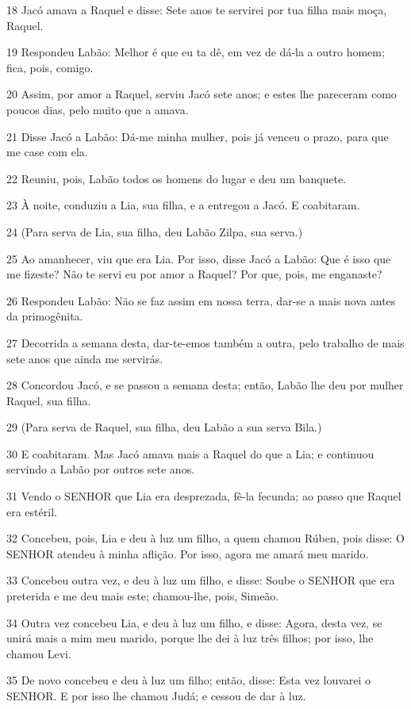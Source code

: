 \par 18 Jacó amava a Raquel e disse: Sete anos te servirei por tua filha mais moça, Raquel.
\par 19 Respondeu Labão: Melhor é que eu ta dê, em vez de dá-la a outro homem; fica, pois, comigo.
\par 20 Assim, por amor a Raquel, serviu Jacó sete anos; e estes lhe pareceram como poucos dias, pelo muito que a amava.
\par 21 Disse Jacó a Labão: Dá-me minha mulher, pois já venceu o prazo, para que me case com ela.
\par 22 Reuniu, pois, Labão todos os homens do lugar e deu um banquete.
\par 23 À noite, conduziu a Lia, sua filha, e a entregou a Jacó. E coabitaram.
\par 24 (Para serva de Lia, sua filha, deu Labão Zilpa, sua serva.)
\par 25 Ao amanhecer, viu que era Lia. Por isso, disse Jacó a Labão: Que é isso que me fizeste? Não te servi eu por amor a Raquel? Por que, pois, me enganaste?
\par 26 Respondeu Labão: Não se faz assim em nossa terra, dar-se a mais nova antes da primogênita.
\par 27 Decorrida a semana desta, dar-te-emos também a outra, pelo trabalho de mais sete anos que ainda me servirás.
\par 28 Concordou Jacó, e se passou a semana desta; então, Labão lhe deu por mulher Raquel, sua filha.
\par 29 (Para serva de Raquel, sua filha, deu Labão a sua serva Bila.)
\par 30 E coabitaram. Mas Jacó amava mais a Raquel do que a Lia; e continuou servindo a Labão por outros sete anos.
\par 31 Vendo o SENHOR que Lia era desprezada, fê-la fecunda; ao passo que Raquel era estéril.
\par 32 Concebeu, pois, Lia e deu à luz um filho, a quem chamou Rúben, pois disse: O SENHOR atendeu à minha aflição. Por isso, agora me amará meu marido.
\par 33 Concebeu outra vez, e deu à luz um filho, e disse: Soube o SENHOR que era preterida e me deu mais este; chamou-lhe, pois, Simeão.
\par 34 Outra vez concebeu Lia, e deu à luz um filho, e disse: Agora, desta vez, se unirá mais a mim meu marido, porque lhe dei à luz três filhos; por isso, lhe chamou Levi.
\par 35 De novo concebeu e deu à luz um filho; então, disse: Esta vez louvarei o SENHOR. E por isso lhe chamou Judá; e cessou de dar à luz.

